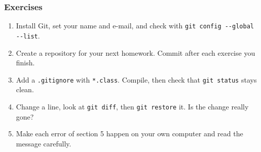 \documentclass[aspectratio=169,10pt,compress]{beamer}
\begin{document}
\begin{frame}[t,fragile] \frametitle{Exercises}
  \begin{enumerate}\small
    \item Install Git, set your name and e-mail, and check with \texttt{git config -{}-global -{}-list}.
    \item Create a repository for your next homework. Commit after each exercise you finish.
    \item Add a \texttt{.gitignore} with \texttt{*.class}. Compile, then check that \texttt{git status} stays clean.
    \item Change a line, look at \texttt{git diff}, then \texttt{git restore} it. Is the change really gone?
    \item Make each error of section 5 happen on your own computer and read the message carefully.
  \end{enumerate}
\end{frame}




\begin{frame}[t,fragile]
	\begin{center}
		\vspace{4cm}
	\end{center}
\end{frame}
\end{document}

